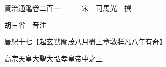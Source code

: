 










 


 
 


 

  
  
  
  
  





  
  
  
  
  
 
  

  

  
  
  



  

 
 

  
   




  

  
  


  　　資治通鑑卷二百一　　　宋　司馬光　撰

　　胡三省　音注

　　唐紀十七【起玄黓閹茂八月盡上章敦牂凡八年有奇】

　　高宗天皇大聖大弘孝皇帝中之上

